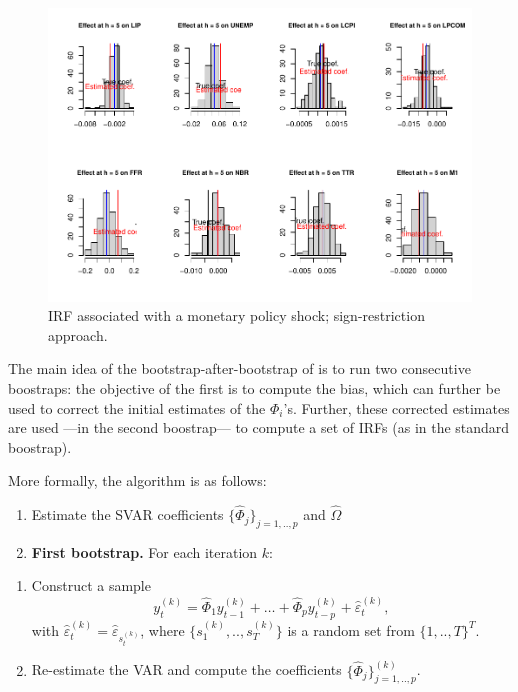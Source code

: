 \documentclass[
  12pt,
]{book}
\providecommand{\tightlist}{%
  \setlength{\itemsep}{0pt}\setlength{\parskip}{0pt}}
\theoremstyle{definition}
\theoremstyle{definition}
\theoremstyle{definition}
\theoremstyle{definition}
\theoremstyle{remark}
\begin{document}
\begin{figure}
\includegraphics[width=0.95\linewidth]{IdentifStructShocks_files/figure-latex/inference5-1} \caption{IRF associated with a monetary policy shock; sign-restriction approach.}\label{fig:inference5}
\end{figure}

The main idea of the bootstrap-after-bootstrap of \citet{Kilian_1998} is to run two consecutive boostraps: the objective of the first is to compute the bias, which can further be used to correct the initial estimates of the \(\Phi_i\)'s. Further, these corrected estimates are used ---in the second boostrap--- to compute a set of IRFs (as in the standard boostrap).

More formally, the algorithm is as follows:

\begin{enumerate}
\def\labelenumi{\arabic{enumi}.}
\tightlist
\item
  Estimate the SVAR coefficients \(\{\widehat{\Phi}_j\}_{j=1,..,p}\) and \(\widehat{\Omega}\)
\item
  \textbf{First bootstrap.} For each iteration \(k\):
\end{enumerate}

\begin{enumerate}
\def\labelenumi{\alph{enumi}.}
\tightlist
\item
  Construct a sample
  \[
  y_t^{(k)}=\widehat{\Phi}_1 y_{t-1}^{(k)} + \dots + \widehat{\Phi}_p y_{t-p}^{(k)} + \hat\varepsilon_t^{(k)},
  \]
  with \(\hat\varepsilon_{t}^{(k)}=\hat\varepsilon_{s_t^{(k)}}\), where \(\{s_1^{(k)},..,s_T^{(k)}\}\) is a random set from \(\{1,..,T\}^T\).
\item
  Re-estimate the VAR and compute the coefficients \(\{\widehat{\Phi}_j\}_{j=1,..,p}^{(k)}\).
\end{enumerate}
\end{document}

